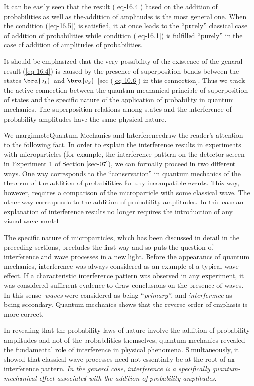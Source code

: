 \documentclass[a4paper,sfsidenotes,colorlinks=true]{tufte-book}
\numberwithin{equation}{section}
\numberwithin{figure}{section}
\begin{document}
It can be easily seen that the result (\ref{eq-16.4}) based on the addition of probabilities as well as the-addition of amplitudes is the most general one. When the condition (\ref{eq-16.5}) is satisfied, it at once leads to the ``purely'' classical case of addition of probabilities while condition (\ref{eq-16.1}) is fulfilled ``purely'' in the case of addition of amplitudes of probabilities.


It should be emphasized that the very possibility of the existence of
the general result (\ref{eq-16.4}) is caused by the presence of
superposition bonds between the states $\bra{s_{1}}$ and $\bra{s_{2}}$
[see (\ref{eq-10.6}) in this connection]. Thus we track the active
connection between the quantum-mechanical principle of superposition
of states and the specific nature of the application of probability in
quantum mechanics. The superposition relations among states and the
interference of probability amplitudes have the same physical nature.


We marginnote{Quantum Mechanics and Interference}draw the reader's
attention to the following fact. In order to explain the interference
results in experiments with microparticles (for example, the
interference pattern on the detector-screen in Experiment 1 of
Section \ref{sec-07}), we can formally proceed in two different ways. One way
corresponds to the ``conservation'' in quantum mechanics of the
theorem of the addition of probabilities for any incompatible
events. This way, however, requires a comparison of the microparticle
with some classical wave. The other way corresponds to the addition of
probability amplitudes. In this case an explanation of interference
results no longer requires the introduction of any visual wave model.

The specific nature of microparticles, which has been discussed in
detail in the preceding sections, precludes the first way and so puts
the question of interference and wave processes in a new light. Before
the appearance of quantum mechanics, interference was always
considered as an example of a typical wave effect. If a characteristic
interference pattern was observed in any experiment, it was considered
sufficient evidence to draw conclusions on the presence of waves. In
this sense, \emph{waves} were considered as being ``\emph{primary''}, and
\emph{interference} as being secondary. Quantum mechanics shows that the
reverse order of emphasis is more correct.


In revealing that the probability laws of nature involve the addition
of probability amplitudes and not of the probabilities themselves,
quantum mechanics revealed the fundamental role of interference in
physical phenomena. Simultaneously, it showed that classical wave
processes need not essentially be at the root of an interference
pattern. \emph{In the general case, interference is a specifically
quantum-mechanical effect associated with the addition of probability
amplitudes.}
\end{document}

